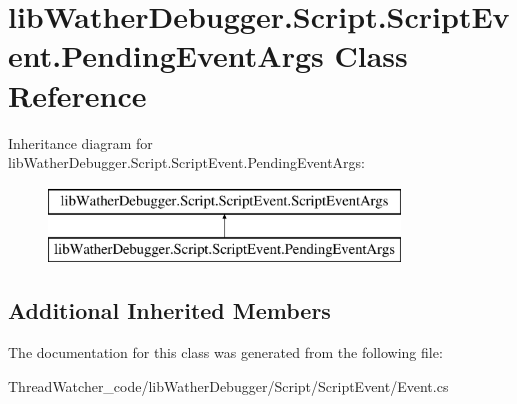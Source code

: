 \hypertarget{classlib_wather_debugger_1_1_script_1_1_script_event_1_1_pending_event_args}{\section{lib\+Wather\+Debugger.\+Script.\+Script\+Event.\+Pending\+Event\+Args Class Reference}
\label{classlib_wather_debugger_1_1_script_1_1_script_event_1_1_pending_event_args}
}
Inheritance diagram for lib\+Wather\+Debugger.\+Script.\+Script\+Event.\+Pending\+Event\+Args\+:\begin{figure}[H]
\begin{center}
\leavevmode
\includegraphics[height=2.000000cm]{classlib_wather_debugger_1_1_script_1_1_script_event_1_1_pending_event_args}
\end{center}
\end{figure}
\subsection*{Additional Inherited Members}


The documentation for this class was generated from the following file\+:\begin{DoxyCompactItemize}
\item 
Thread\+Watcher\+\_\+code/lib\+Wather\+Debugger/\+Script/\+Script\+Event/Event.\+cs\end{DoxyCompactItemize}
